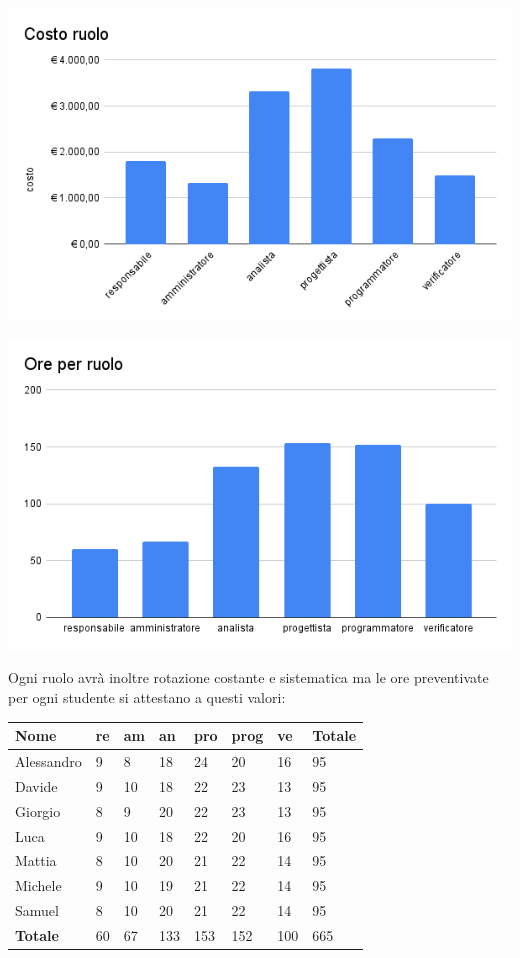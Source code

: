 \begin{minipage}[c][][c]{0.49\linewidth}  
\includegraphics[width=\textwidth]{immagini/Costo ruolo.png}
\end{minipage}
\begin{minipage}[c][][c]{0.49\linewidth}  
\includegraphics[width=\textwidth]{immagini/Ore per ruolo.png}
\end{minipage}

Ogni ruolo avrà inoltre rotazione costante e sistematica ma le ore preventivate per ogni studente si attestano a questi valori:

\begin{center}
    \begin{tabularx}{13cm}{X |l l l l l l| X}          
        \textbf{Nome} & \textbf{re} & \textbf{am} & \textbf{an} & \textbf{pro} & \textbf{prog} & \textbf{ve}& \textbf{Totale}\\
        \hline
        Alessandro &9&8&18&24&20&16&95 \\
        Davide &9&10&18&22&23&13&95\\
        Giorgio &8&9&20&22&23&13&95\\
        Luca &9&10&18&22&20&16&95\\
        Mattia &8&10&20&21&22&14&95\\
        Michele &9&10&19&21&22&14&95\\
        Samuel &8&10&20&21&22&14&95\\
        \hline
        \textbf{Totale} &60&67&133&153&152&100&665
    \end{tabularx}
\end{center}

